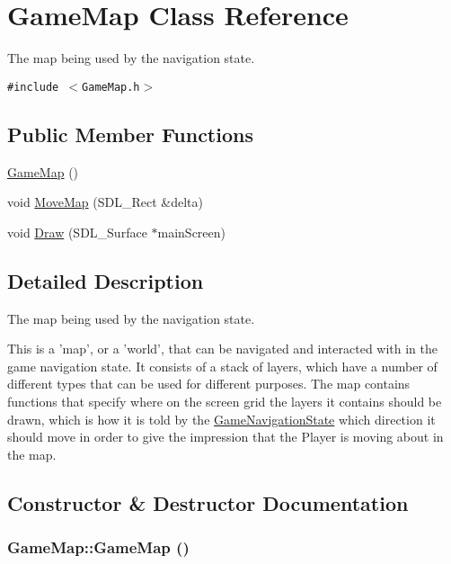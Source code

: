 \hypertarget{class_game_map}{
\section{GameMap Class Reference}
\label{d4/de2/class_game_map}
}
The map being used by the navigation state.  


{\tt \#include $<$GameMap.h$>$}

\subsection*{Public Member Functions}
\begin{CompactItemize}
\item 
\hyperlink{class_game_map_ae71e5694cf19612fcaa4c1e21b03b71}{GameMap} ()
\item 
void \hyperlink{class_game_map_f353eaa95b9b0f7744ad8aa6a6d31158}{MoveMap} (SDL\_\-Rect \&delta)
\item 
void \hyperlink{class_game_map_bde2fbb121a24223a62ab45e3366b4e3}{Draw} (SDL\_\-Surface $\ast$mainScreen)
\end{CompactItemize}


\subsection{Detailed Description}
The map being used by the navigation state. 

This is a 'map', or a 'world', that can be navigated and interacted with in the game navigation state. It consists of a stack of layers, which have a number of different types that can be used for different purposes. The map contains functions that specify where on the screen grid the layers it contains should be drawn, which is how it is told by the \hyperlink{class_game_navigation_state}{GameNavigationState} which direction it should move in order to give the impression that the Player is moving about in the map. 

\subsection{Constructor \& Destructor Documentation}
\hypertarget{class_game_map_ae71e5694cf19612fcaa4c1e21b03b71}{
\subsubsection[{GameMap}]{\setlength{\rightskip}{0pt plus 5cm}GameMap::GameMap ()}}
\label{d4/de2/class_game_map_ae71e5694cf19612fcaa4c1e21b03b71}




